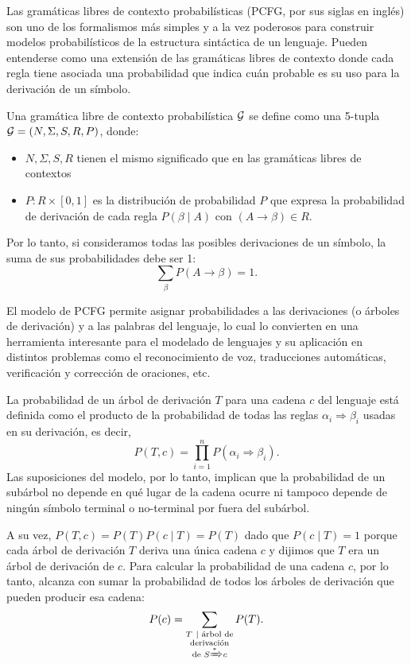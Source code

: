 Las gramáticas libres de contexto probabilísticas (PCFG, por sus siglas en inglés) \cite{booth1969probabilistic} son uno de los formalismos más simples y a la vez poderosos para construir modelos probabilísticos de la estructura sintáctica de un lenguaje. Pueden entenderse como una extensión de las gramáticas libres de contexto donde cada regla tiene asociada una probabilidad que indica cuán probable es su uso para la derivación de un símbolo.

\begin{definicion}[PCFG]
Una gramática libre de contexto probabilística $\gram$ se define como una 5-tupla $\gram = (N, \Sigma, S, R, P)$, donde:
\begin{itemize}
    \item $N, \Sigma, S, R$ tienen el mismo significado que en las gramáticas libres de contextos
    \item $P : R \times [0,1]$ es la distribución de probabilidad $P$ que expresa la probabilidad de derivación de cada regla $P(\beta \mid A)$ con $(A \to \beta) \in R$.
\end{itemize}
Por lo tanto, si consideramos todas las posibles derivaciones de un símbolo, la suma de sus probabilidades debe ser 1:
$$
\sum_{\beta} P (A \to \beta) = 1.
$$
\end{definicion}
El modelo de PCFG permite asignar probabilidades a las derivaciones (o árboles de derivación) y a las palabras del lenguaje, lo cual lo convierten en una herramienta interesante para el modelado de lenguajes y su aplicación en distintos problemas como el reconocimiento de voz, traducciones automáticas, verificación y corrección de oraciones, etc.

La probabilidad de un árbol de derivación $T$ para una cadena $c$ del lenguaje está definida como el producto de la probabilidad de todas las reglas $\alpha_{i} \Rightarrow \beta_i$ usadas en su derivación, es decir,
$$
P(T,c) = \prod_{i = 1}^{n} P(\alpha_{i} \Rightarrow \beta_i).
$$
Las suposiciones del modelo, por lo tanto, implican que la probabilidad de un subárbol no depende en qué lugar de la cadena ocurre ni tampoco depende de ningún símbolo terminal o no-terminal por fuera del subárbol.

A su vez, $P(T,c) = P(T) P(c\mid T) = P(T)$ dado que $P(c\mid T) = 1$ porque cada árbol de derivación $T$ deriva una única cadena $c$ y dijimos que $T$ era un árbol de derivación de $c$. Para calcular la probabilidad de una cadena $c$, por lo tanto, alcanza con sumar la probabilidad de todos los árboles de derivación que pueden producir esa cadena:
%
$$
P(c) = \sum_{\substack{T\ \mid \text{ árbol de}\\\text{derivación} \\  \text{de } S \xRightarrow{\ast} c }}   P (T).
$$



